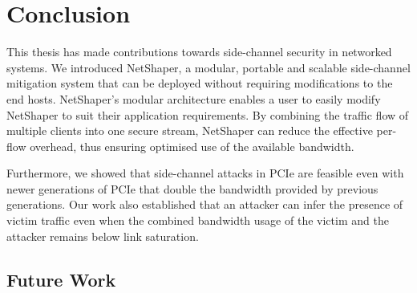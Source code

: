 \chapter{Conclusion}
\label{chap:conclusion}

This thesis has made contributions towards side-channel security in networked systems.
We introduced NetShaper, a modular, portable and scalable side-channel mitigation system that can be deployed without requiring modifications to the end hosts.
NetShaper's modular architecture enables a user to easily modify NetShaper to suit their application requirements.
By combining the traffic flow of multiple clients into one secure stream, NetShaper can reduce the effective per-flow overhead, thus ensuring optimised use of the available bandwidth.

Furthermore, we showed that side-channel attacks in PCIe are feasible even with newer generations of PCIe that double the bandwidth provided by previous generations.
Our work also established that an attacker can infer the presence of victim traffic even when the combined bandwidth usage of the victim and the attacker remains below link saturation.

\section{Future Work}

